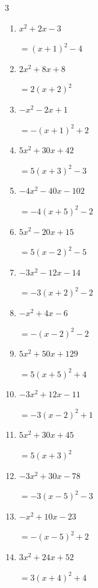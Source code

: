 \begin{multicols}{3}
\begin{enumerate}
  \item $x^{2}+2x-3$

        $=\left( x+1\right)^{2}-4$

  \item $2x^{2}+8x+8$

        $=2\left( x+2\right)^{2}$

  \item $-x^{2}-2x+1$

        $=-\left( x+1\right)^{2}+2$

  \item $5x^{2}+30x+42$

        $=5\left( x+3\right)^{2}-3$

\columnbreak %

  \item $-4x^{2}-40x-102$

        $=-4\left( x+5\right)^{2}-2$

  \item $5x^{2}-20x+15$

        $=5\left( x-2\right)^{2}-5$

  \item $-3x^{2}-12x-14$

        $=-3\left( x+2\right)^{2}-2$

  \item $-x^{2}+4x-6$

        $=-\left( x-2\right)^{2}-2$

  \item $5x^{2}+50x+129$

        $=5\left( x+5\right)^{2}+4$

  \item $-3x^{2}+12x-11$

        $=-3\left( x-2\right)^{2}+1$

  \item $5x^{2}+30x+45$

        $=5\left( x+3\right)^{2}$

  \item $-3x^{2}+30x-78$

        $=-3\left( x-5\right)^{2}-3$

  \item $-x^{2}+10x-23$

        $=-\left( x-5\right)^{2}+2$

  \item $3x^{2}+24x+52$

        $=3\left( x+4\right)^{2}+4$


\end{enumerate}
\end{multicols}
